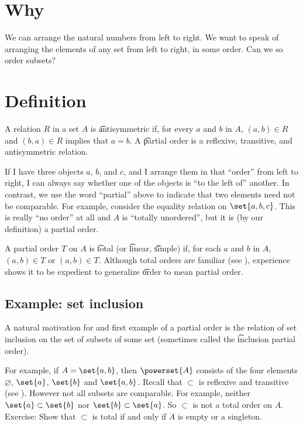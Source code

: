 
\section*{Why}

We can arrange the natural numbers from left to right.
We want to speak of arranging the elements of any set from left to right, in some order.
Can we so order subsets?

\section*{Definition}

A relation $R$ in a set $A$ is \t{antisymmetric} if, for every $a$ and $b$ in $A$, $(a, b) \in R$ and $(b, a) \in R$ implies that $a = b$.
A \t{partial order} is a reflexive, transitive, and antisymmetric relation.

If I have three objects $a$, $b$, and $c$, and I arrange them in that ``order'' from left to right, I can always say whether one of the objects is ``to the left of'' another.
In contrast, we use the word ``partial'' above to indicate that two elements need not be comparable.
For example, consider the equality relation on $\set{a, b, c}$.
This is really ``no order'' at all and $A$ is ``totally unordered'', but it is (by our definition) a partial order.

A partial order $T$ on $A$ is \t{total} (or \t{linear}, \t{simple}) if, for each $a$ and $b$ in $A$, $(a, b) \in T$ or $(a, b) \in T$.
Although total orders are familiar (see ), experience shows it to be expedient to generalize \t{order} to mean partial order.

\subsection*{Example: set inclusion}

A natural motivation for and first example of a partial order is the relation of set inclusion on the set of subsets of some set (sometimes called the \t{inclusion partial order}).

For example, if $A = \set{a, b}$, then $\powerset{A}$ consists of the four elements $\varnothing$, $\set{a}$, $\set{b}$ and $\set{a,b}$.
Recall that $\subset$ is reflexive and transitive (see ).
However not all subsets are comparable.
For example, neither $\set{a} \subset \set{b}$ nor $\set{b} \subset \set{a}$.
So $\subset$ is not a total order on $A$.
Exercise: Show that $\subset$ is total if and only if $A$ is empty or a singleton.

